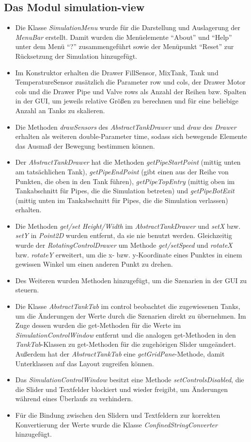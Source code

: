 \documentclass[parskip=full]{scrartcl}
\begin{document}
\subsection{Das Modul simulation-view}
\begin{itemize}
 \item Die Klasse \emph{SimulationMenu} wurde für die Darstellung und Auslagerung der \emph{MenuBar} erstellt. Damit wurden die Menüelemente "`About"' und "`Help"' unter dem Menü "`?"' zusammengeführt sowie der Menüpunkt "`Reset"' zur Rücksetzung der Simulation hinzugefügt.
 \item Im Konstruktor erhalten die Drawer FillSensor, MixTank, Tank und TemperatureSensor zusätzlich die Parameter row und cols, der Drawer Motor cols und die Drawer Pipe und Valve rows als Anzahl der Reihen bzw. Spalten in der GUI, um jeweils relative Größen zu berechnen und für eine beliebige Anzahl an Tanks zu skalieren.
 \item Die Methoden \emph{drawSensors} des \emph{AbstractTankDrawer} und \emph{draw} des \emph{Drawer} erhalten als weiteren double-Parameter time, sodass sich bewegende Elemente das Ausmaß der Bewegung bestimmen können.
 \item Der \emph{AbstractTankDrawer} hat die Methoden \emph{getPipeStartPoint} (mittig unten am tatsächlichen Tank), \emph{getPipeEndPoint} (gibt einen aus der Reihe von Punkten, die oben in den Tank führen), \emph{getPipeTopEntry} (mittig oben im Tankabschnitt für Pipes, die die Simulation betreten) und \emph{getPipeBotExit} (mittig unten im Tankabschnitt für Pipes, die die Simulation verlassen) erhalten.
 \item Die Methoden \emph{get/set Height/Width} im \emph{AbstractTankDrawer} und \emph{setX} bzw. \emph{setY} in \emph{Point2D} wurden entfernt, da sie nie benutzt werden. Gleichzeitig wurde der \emph{RotatingControlDrawer} um Methode \emph{get/setSpeed} und \emph{rotateX} bzw. \emph{rotateY} erweitert, um die x- bzw. y-Koordinate eines Punktes in einem gewissen Winkel um einen anderen Punkt zu drehen.
 \item Des Weiteren wurden Methoden hinzugefügt, um die Szenarien in der GUI zu steuern.
 \item Die Klasse \emph{AbstractTankTab} im control beobachtet die zugewiesenen Tanks, um die Änderungen der Werte durch die Szenarien direkt zu übernehmen. Im Zuge dessen wurden die get-Methoden für die Werte im \emph{SimulationControlWindow} entfernt und die analogen get-Methoden in den \emph{TankTab}-Klassen zu get-Methoden für die zugehörigen Slider umgeändert. Außerdem hat der \emph{AbstractTankTab} eine \emph{getGridPane}-Methode, damit Unterklassen auf das Layout zugreifen können.
 \item Das \emph{SimulationControlWindow} besitzt eine Methode \emph{setControlsDisabled}, die die Slider und Textfelder blockiert und wieder freigibt, um Änderungen während eines Überlaufs zu verhindern.
 \item Für die Bindung zwischen den Slidern und Textfeldern zur korrekten Konvertierung der Werte wurde die Klasse \emph{ConfinedStringConverter} hinzugefügt.
\end{itemize}
\end{document}
